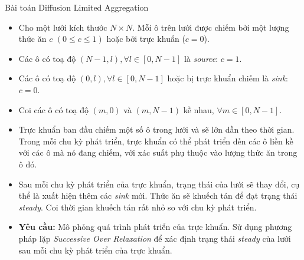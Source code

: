 \begin{frame}[allowframebreaks]{Bài toán Diffusion Limited Aggregation}
\begin{itemize}
	\item Cho một lưới kích thước $N \times N$. Mỗi ô trên lưới được chiếm bởi một lượng thức ăn $c$ $(0 \leq c \leq 1)$ hoặc bởi trực khuẩn ($c = 0$).
	\item Các ô có toạ độ $(N - 1, l), \forall l \in [0, N - 1]$ là \emph{source}: $c = 1$.
	\item Các ô có toạ độ $(0, l), \forall l \in [0, N - 1]$ hoặc bị trực khuẩn chiếm là \emph{sink}: $c = 0$.
	\item Coi các ô có toạ độ $(m, 0)$ và $(m, N - 1)$ kề nhau, $\forall m \in [0, N - 1]$.
	\item Trực khuẩn ban đầu chiếm một số ô trong lưới và sẽ lớn dần theo thời gian. Trong mỗi chu kỳ phát triển, trực khuẩn có thể phát triển đến các ô liền kề với các ô mà nó đang chiếm, với xác suất phụ thuộc vào lượng thức ăn trong ô đó.
	\item Sau mỗi chu kỳ phát triển của trực khuẩn, trạng thái của lưới sẽ thay đổi, cụ thể là xuất hiện thêm các \emph{sink} mới. Thức ăn sẽ khuếch tán để đạt trạng thái \emph{steady}. Coi thời gian khuếch tán rất nhỏ so với chu kỳ phát triển.
	\item \textbf{Yêu cầu:} Mô phỏng quá trình phát triển của trực khuẩn. Sử dụng phương pháp lặp \emph{Successive Over Relaxation} để xác định trạng thái \emph{steady} của lưới sau mỗi chu kỳ phát triển của trực khuẩn. 
\end{itemize}
\end{frame}